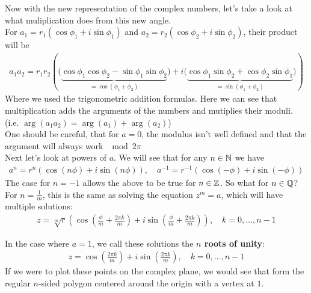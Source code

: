 Now with the new representation of the complex numbers, let's take a look at what muliplication does from this new angle.\\
For $a_1 = r_1(\cos \phi_1 + i \sin \phi_1)$ and $a_2 = r_2(\cos \phi_2 + i \sin \phi_2)$, their product will be
\begin{align*}
				a_1a_2 = r_1 r_2 \left( \bigg(\underbrace{\cos\phi_1 \cos\phi_2 - \sin\phi_1 \sin \phi_2}_{= \cos(\phi_1 + \phi_2)} \bigg) + i \bigg(\underbrace{\cos\phi_1 \sin\phi_2 + \cos\phi_2 \sin\phi_1}_{= \sin(\phi_1 + \phi_2)}\bigg)\right)
\end{align*}
Where we used the trigonometric addition formulas. Here we can see that multiplication adds the arguments of the numbers and mutiplies their moduli. (i.e. $\arg(a_1a_2) = \arg(a_1) + \arg(a_2)$)\\
One should be careful, that for $a = 0$, the modulus isn't well defined and that the argument will always work $\mod 2\pi$\\
Next let's look at powers of $a$. We will see that for any $n \in \mathbb{N}$ we have
\begin{align*}
				a^n = r^n( \cos(n\phi) + i \sin(n\phi)), \quad a^{-1} = r^{-1} (\cos(-\phi) + i \sin(-\phi))
\end{align*}
The case for $n = -1$ allows the above to be true for $n \in \mathbb{Z}$. So what for $n \in \mathbb{Q}$? For $n = \frac{1}{m}$, this is the same as solving the equation $z^m = a$, which will have multiple solutions:
\begin{align*}
				z = \sqrt[m]{r} \left(\cos \left(\frac{\phi}{m} + \frac{2\pi k}{m}\right) + i \sin \left(\frac{\phi}{m} + \frac{2\pi k}{m}\right)\right), \quad k = 0, \ldots, n-1
\end{align*}

In the case where $a = 1$, we call these solutions the \textbf{$n$ roots of unity}:
\begin{align*}
				z = \cos \left(\frac{2 \pi k}{m}\right) + i \sin \left(\frac{2 \pi k}{m}\right), \quad k = 0, \ldots, n-1
\end{align*}
If we were to plot these points on the complex plane, we would see that form the regular $n$-sided polygon centered around the origin with a vertex at $1$.\\




